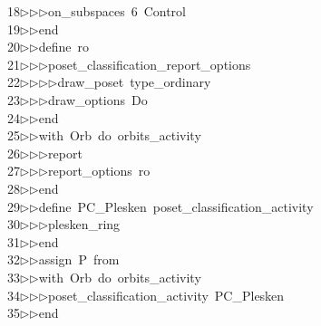 \begin{tabbing}
18\>$\triangleright$\>$\triangleright$\>$\triangleright$\>on\_subspaces\ 6\ Control\ \\[0pt]
19\>$\triangleright$\>$\triangleright$\>end\ \\[0pt]
20\>$\triangleright$\>$\triangleright$\>define\ ro\ \\[0pt]
21\>$\triangleright$\>$\triangleright$\>$\triangleright$\>poset\_classification\_report\_options\ \\[0pt]
22\>$\triangleright$\>$\triangleright$\>$\triangleright$\>$\triangleright$\>draw\_poset\ type\_ordinary\ \\[0pt]
23\>$\triangleright$\>$\triangleright$\>$\triangleright$\>draw\_options\ Do\ \\[0pt]
24\>$\triangleright$\>$\triangleright$\>end\ \\[0pt]
25\>$\triangleright$\>$\triangleright$\>with\ Orb\ do\ orbits\_activity\ \\[0pt]
26\>$\triangleright$\>$\triangleright$\>$\triangleright$\>report\ \ \\[0pt]
27\>$\triangleright$\>$\triangleright$\>$\triangleright$\>report\_options\ ro\ \\[0pt]
28\>$\triangleright$\>$\triangleright$\>end\ \\[0pt]
29\>$\triangleright$\>$\triangleright$\>define\ PC\_Plesken\ poset\_classification\_activity\ \\[0pt]
30\>$\triangleright$\>$\triangleright$\>$\triangleright$\>plesken\_ring\ \\[0pt]
31\>$\triangleright$\>$\triangleright$\>end\ \\[0pt]
32\>$\triangleright$\>$\triangleright$\>assign\ P\ from\ \\[0pt]
33\>$\triangleright$\>$\triangleright$\>with\ Orb\ do\ orbits\_activity\ \\[0pt]
34\>$\triangleright$\>$\triangleright$\>$\triangleright$\>poset\_classification\_activity\ PC\_Plesken\ \\[0pt]
35\>$\triangleright$\>$\triangleright$\>end\ \\[0pt]

\end{tabbing}
